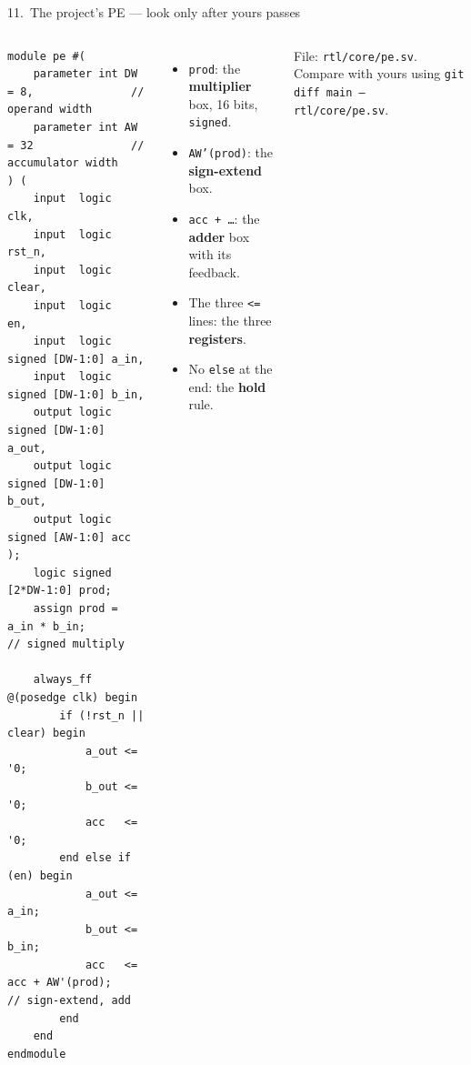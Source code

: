 \documentclass[aspectratio=169,11pt]{beamer}
\newcommand{\sig}[1]{\texttt{#1}}
\begin{document}
\begin{frame}[fragile]{11.\ The project's PE --- look only after yours passes}
  \begin{columns}[T]
\begin{lstlisting}[basicstyle=\ttfamily\fontsize{6.2}{7.2}\selectfont]
module pe #(
    parameter int DW = 8,               // operand width
    parameter int AW = 32               // accumulator width
) (
    input  logic                 clk,
    input  logic                 rst_n,
    input  logic                 clear,
    input  logic                 en,
    input  logic signed [DW-1:0] a_in,
    input  logic signed [DW-1:0] b_in,
    output logic signed [DW-1:0] a_out,
    output logic signed [DW-1:0] b_out,
    output logic signed [AW-1:0] acc
);
    logic signed [2*DW-1:0] prod;
    assign prod = a_in * b_in;          // signed multiply

    always_ff @(posedge clk) begin
        if (!rst_n || clear) begin
            a_out <= '0;
            b_out <= '0;
            acc   <= '0;
        end else if (en) begin
            a_out <= a_in;
            b_out <= b_in;
            acc   <= acc + AW'(prod);    // sign-extend, add
        end
    end
endmodule
\end{lstlisting}
    \small
    \begin{itemize}
      \item \sig{prod}: the \textbf{multiplier} box, 16 bits, \sig{signed}.
      \item \sig{AW'(prod)}: the \textbf{sign-extend} box.
      \item \sig{acc + \ldots}: the \textbf{adder} box with its feedback.
      \item The three \sig{<=} lines: the three \textbf{registers}.
      \item No \sig{else} at the end: the \textbf{hold} rule.
    \end{itemize}
    \vspace{2mm}
    \footnotesize\color{muted} File: \sig{rtl/core/pe.sv}. Compare with yours using
    \sig{git diff main -- rtl/core/pe.sv}.
  \end{columns}
\end{frame}
\end{document}
